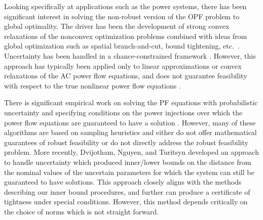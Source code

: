 Looking specifically at applications such as the power systems, there has been significant interest in solving the non-robust version of the OPF problem to global optimality.
The driver has been the development of strong convex relaxations of the nonconvex optimization problems combined with ideas from global optimization such as spatial branch-and-cut, bound tightening, etc.~\cite{BiMu2016,coffrin2015strengthening}.
Uncertainty has been handled in a chance-constrained framework \cite{BiChHa2014,zhang2011chance}.
However, this approach has typically been applied only to linear approximations or convex relaxations of the AC power flow equations, and does not guarantee feasibility with respect to the true nonlinear power flow equations \cite{BiChHa2014,kocuk2016strong,RoVrOlAn2015,TsBiTa2016}.

There is significant empirical work on solving the PF equations with probabilistic uncertainty \cite{morales2007point,wang1992interval} and specifying conditions on the power injections over which the power flow equations are guaranteed to have a solution \cite{bolognani2016existence,EPFLA,EPFLB}.
However, many of these algorithms are based on sampling heuristics and either do not offer mathematical guarantees of robust feasibility or do not directly address the robust feasibility problem.
More recently, Dvijotham, Nguyen, and Turitsyn \cite{DjTuritsyn} developed an approach to handle uncertainty which produced inner/lower bounds on the distance from the nominal values of the uncertain parameters for which the system can still be guaranteed to have solutions.
This approach closely aligns with the methods describing our inner bound procedures, and further can produce a certificate of tightness under special conditions. 
However, this method depends critically on the choice of norms which is not straight forward.
